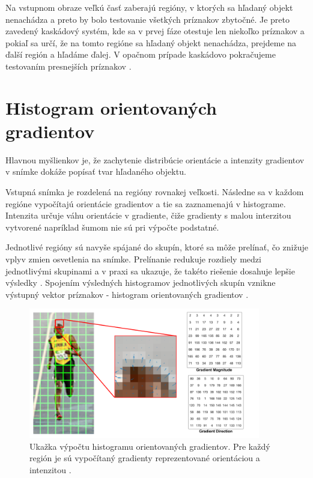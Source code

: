 Na vstupnom obraze veľkú časť zaberajú regióny, v ktorých sa hľadaný objekt nenachádza a preto by bolo testovanie všetkých príznakov zbytočné.
Je preto zavedený kaskádový systém, kde sa v prvej fáze otestuje len niekoľko príznakov a pokiaľ sa určí, že na tomto regióne sa hľadaný objekt nenachádza, prejdeme na ďalší región a hľadáme ďalej.
V opačnom prípade kaskádovo pokračujeme testovaním presnejších príznakov \cite{violajones}. 

\section{Histogram orientovaných gradientov}
Hlavnou myšlienkov je, že zachytenie distribúcie orientácie a intenzity gradientov v snímke dokáže popísať tvar hľadaného objektu.

Vstupná snímka je rozdelená na regióny rovnakej veľkosti.
Následne sa v každom regióne vypočítajú orientácie gradientov a tie sa zaznamenajú v histograme.
Intenzita určuje váhu orientácie v gradiente, čiže gradienty s malou interzitou vytvorené napríklad šumom nie sú pri výpočte podstatné.

Jednotlivé regióny sú navyše spájané do skupín, ktoré sa môže prelínať, čo znižuje vplyv zmien osvetlenia na snímke.
Prelínanie redukuje rozdiely medzi jednotlivými skupinami a v praxi sa ukazuje, že takéto riešenie dosahuje lepšie výsledky \cite{hogov}.
Spojením výsledných histogramov jednotlivých skupín vznikne výstupný vektor príznakov - histogram orientovaných gradientov \cite{hog1} \cite{hog2}.

\begin{figure}[H]
\centerline{\includegraphics[width=0.9\textwidth]{images/hog_example}}
\caption[Ukažka výpočtu histogramu orientovaných gradientov]{Ukažka výpočtu histogramu orientovaných gradientov. Pre každý región je sú vypočítaný gradienty reprezentované orientáciou a intenzitou \cite{hogov}.}
\label{obr:hog_example}
\end{figure}


